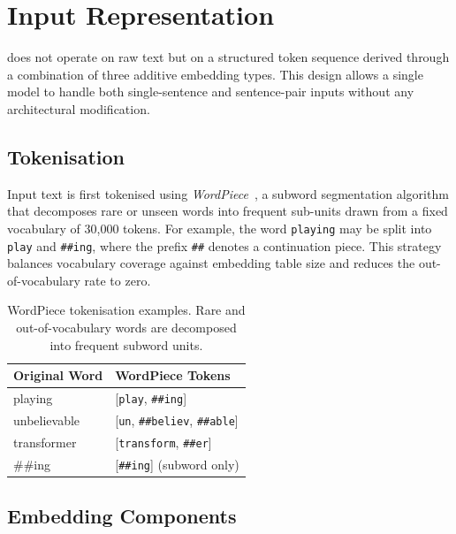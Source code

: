 
\section{Input Representation}
\label{sec:input}

\bert{} does not operate on raw text but on a structured token sequence derived
through a combination of three additive embedding types.  This design allows a
single model to handle both single-sentence and sentence-pair inputs without any
architectural modification.

\subsection{Tokenisation}
\label{subsec:tokenisation}

Input text is first tokenised using \emph{WordPiece}~\cite{wu2016googles}, a
subword segmentation algorithm that decomposes rare or unseen words into frequent
sub-units drawn from a fixed vocabulary of 30,000 tokens.  For example, the word
\texttt{playing} may be split into \texttt{play} and \texttt{\#\#ing}, where the
prefix \texttt{\#\#} denotes a continuation piece.  This strategy balances
vocabulary coverage against embedding table size and reduces the out-of-vocabulary
rate to zero.

\begin{table}[H]
  \centering
  \caption{WordPiece tokenisation examples. Rare and out-of-vocabulary words are
           decomposed into frequent subword units.}
  \label{tab:tokenisation}
  \renewcommand{\arraystretch}{1.4}
  \begin{tabular}{ll}
    \toprule
    \textbf{Original Word} & \textbf{WordPiece Tokens} \\
    \midrule
    playing & [\texttt{play}, \texttt{\#\#ing}] \\
    unbelievable & [\texttt{un}, \texttt{\#\#believ}, \texttt{\#\#able}] \\
    transformer & [\texttt{transform}, \texttt{\#\#er}] \\
    \#\#ing & [\texttt{\#\#ing}] (subword only) \\
    \bottomrule
  \end{tabular}
\end{table}

\subsection{Embedding Components}
\label{subsec:embeddings}

